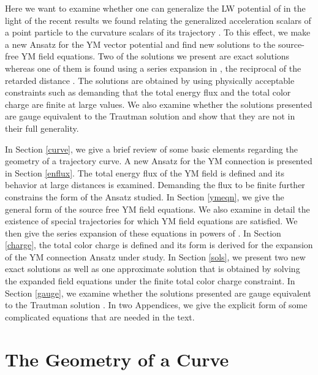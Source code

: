 \documentclass[a4paper,twocolumn,prd,showpacs,amsmath,amssymb]{revtex4}
\begin{document}
Here we want to examine whether one can generalize the LW potential of \cite{traut}
in the light of the recent results we found relating the generalized acceleration
scalars \coordHE{} of a point particle to the curvature scalars of its trajectory
\cite{gs1}. To this effect, we make a new Ansatz for the YM vector potential
and find new solutions to the source-free YM field equations. Two of the solutions
we present are exact solutions whereas one of them is found using a series expansion
in \coordHE{}, the reciprocal of the retarded distance \coordHE{}. The solutions are obtained by
using physically acceptable constraints such as demanding that the total energy
flux \coordHE{} and the total color charge \coordHE{} are finite at large
\coordHE{} values. We also examine whether the solutions presented are gauge equivalent
to the Trautman solution and show that they are not in their full generality.

In Section \ref{curve}, we give a brief review of some basic elements regarding
the geometry of a trajectory curve. A new Ansatz for the YM connection is
presented in Section \ref{enflux}. The total energy flux of the YM field
is defined and its behavior at large distances is examined. Demanding the
flux to be finite further constrains the form of the Ansatz studied. In Section
\ref{ymeqn}, we give the general form of the source free YM field equations.
We also examine in detail the existence of special trajectories for which
YM field equations are satisfied. We then give the series expansion of these
equations in powers of \coordHE{}. In Section \ref{charge}, the total color
charge is defined and its form is derived for the \coordHE{} expansion of the
YM connection Ansatz under study. In Section \ref{sols}, we present two
new exact solutions as well as one approximate solution that is obtained
by solving the \coordHE{} expanded field equations under the finite total
color charge constraint. In Section \ref{gauge}, we examine whether the
solutions presented are gauge equivalent to the Trautman solution \cite{traut}.
In two Appendices, we give the explicit form of some complicated equations
that are needed in the text.

\section{\label{curve} The Geometry of a Curve}
\end{document}
